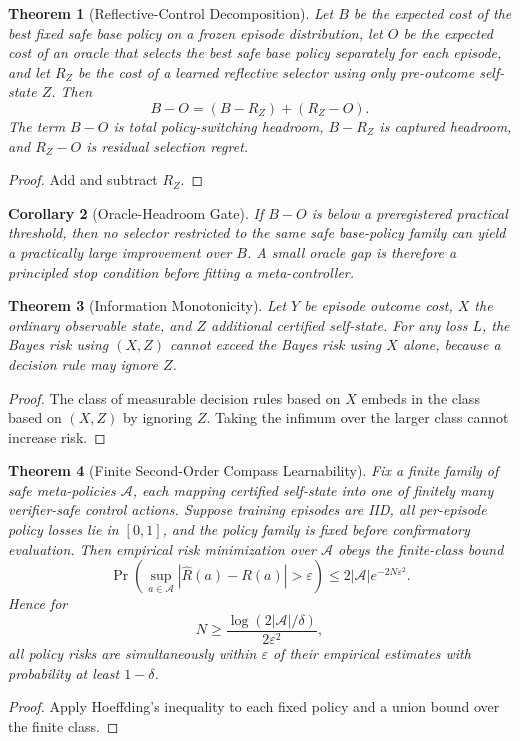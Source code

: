 \documentclass[11pt]{article}
\newtheorem{theorem}{Theorem}[section]
\newtheorem{corollary}[theorem]{Corollary}
\begin{document}
\begin{theorem}[Reflective-Control Decomposition]
Let $B$ be the expected cost of the best fixed safe base policy on a frozen episode distribution, let $O$ be the expected cost of an oracle that selects the best safe base policy separately for each episode, and let $R_Z$ be the cost of a learned reflective selector using only pre-outcome self-state $Z$. Then
\[
B-O=(B-R_Z)+(R_Z-O).
\]
The term $B-O$ is total policy-switching headroom, $B-R_Z$ is captured headroom, and $R_Z-O$ is residual selection regret.
\end{theorem}
\begin{proof}
Add and subtract $R_Z$.
\end{proof}

\begin{corollary}[Oracle-Headroom Gate]
If $B-O$ is below a preregistered practical threshold, then no selector restricted to the same safe base-policy family can yield a practically large improvement over $B$. A small oracle gap is therefore a principled stop condition before fitting a meta-controller.
\end{corollary}

\begin{theorem}[Information Monotonicity]
Let $Y$ be episode outcome cost, $X$ the ordinary observable state, and $Z$ additional certified self-state. For any loss $L$, the Bayes risk using $(X,Z)$ cannot exceed the Bayes risk using $X$ alone, because a decision rule may ignore $Z$.
\end{theorem}
\begin{proof}
The class of measurable decision rules based on $X$ embeds in the class based on $(X,Z)$ by ignoring $Z$. Taking the infimum over the larger class cannot increase risk.
\end{proof}

\begin{theorem}[Finite Second-Order Compass Learnability]
Fix a finite family of safe meta-policies $\mathcal A$, each mapping certified self-state into one of finitely many verifier-safe control actions. Suppose training episodes are IID, all per-episode policy losses lie in $[0,1]$, and the policy family is fixed before confirmatory evaluation. Then empirical risk minimization over $\mathcal A$ obeys the finite-class bound
\[
\Pr\!\left(\sup_{a\in\mathcal A}|\widehat R(a)-R(a)|>\varepsilon\right)
\le 2|\mathcal A|e^{-2N\varepsilon^2}.
\]
Hence for
\[
N\ge \frac{\log(2|\mathcal A|/\delta)}{2\varepsilon^2},
\]
all policy risks are simultaneously within $\varepsilon$ of their empirical estimates with probability at least $1-\delta$.
\end{theorem}
\begin{proof}
Apply Hoeffding's inequality to each fixed policy and a union bound over the finite class.
\end{proof}
\end{document}
